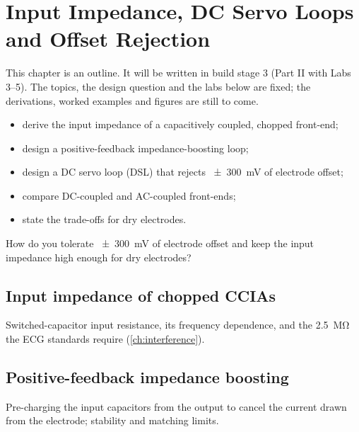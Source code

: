 \chapter{Input Impedance, DC Servo Loops and Offset Rejection}\label{ch:dsl}

\begin{specnote}
This chapter is an outline. It will be written in build stage 3 (Part II with Labs 3--5). The topics, the design question and the labs below are fixed; the derivations, worked examples and figures are still to come.
\end{specnote}

\begin{objectives}
\begin{itemize}
  \item derive the input impedance of a capacitively coupled, chopped front-end;
  \item design a positive-feedback impedance-boosting loop;
  \item design a DC servo loop (DSL) that rejects \qty{\pm 300}{\milli\volt} of electrode offset;
  \item compare DC-coupled and AC-coupled front-ends;
  \item state the trade-offs for dry electrodes.
\end{itemize}
\end{objectives}

\begin{insight}
How do you tolerate \qty{\pm 300}{\milli\volt} of electrode offset and keep the input impedance high enough for dry electrodes?
\end{insight}

\section{Input impedance of chopped CCIAs}\label{sec:ch10-1}
Switched-capacitor input resistance, its frequency dependence, and the \qty{2.5}{\mega\ohm} the ECG standards require (\cref{ch:interference}).

\section{Positive-feedback impedance boosting}\label{sec:ch10-2}
Pre-charging the input capacitors from the output to cancel the current drawn from the electrode; stability and matching limits.

